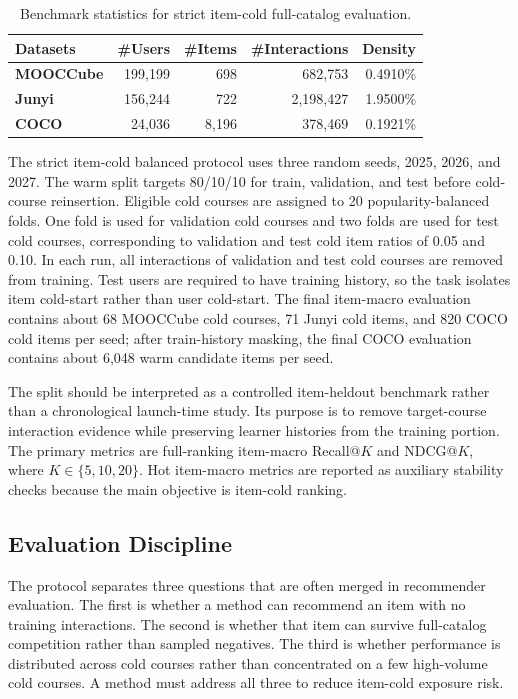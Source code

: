 \documentclass[sigconf,anonymous,review]{acmart}
\begin{document}
\begin{table}[t]
\centering
\caption{Benchmark statistics for strict item-cold full-catalog evaluation.}
\label{tab:dataset-statistics}
\small
\setlength{\tabcolsep}{14pt}
\renewcommand{\arraystretch}{1.05}
\begin{tabular}{lrrrr}
\toprule
\textbf{Datasets} & \textbf{\#Users} & \textbf{\#Items} & \textbf{\#Interactions} & \textbf{Density} \\
\midrule
\textbf{MOOCCube} & 199,199 & 698 & 682,753 & 0.4910\% \\
\textbf{Junyi} & 156,244 & 722 & 2,198,427 & 1.9500\% \\
\textbf{COCO} & 24,036 & 8,196 & 378,469 & 0.1921\% \\
\bottomrule
\end{tabular}
\end{table}

The strict item-cold balanced protocol uses three random seeds, 2025, 2026, and 2027. The warm split targets 80/10/10 for train, validation, and test before cold-course reinsertion. Eligible cold courses are assigned to 20 popularity-balanced folds. One fold is used for validation cold courses and two folds are used for test cold courses, corresponding to validation and test cold item ratios of 0.05 and 0.10. In each run, all interactions of validation and test cold courses are removed from training. Test users are required to have training history, so the task isolates item cold-start rather than user cold-start. The final item-macro evaluation contains about 68 MOOCCube cold courses, 71 Junyi cold items, and 820 COCO cold items per seed; after train-history masking, the final COCO evaluation contains about 6,048 warm candidate items per seed.

The split should be interpreted as a controlled item-heldout benchmark rather than a chronological launch-time study. Its purpose is to remove target-course interaction evidence while preserving learner histories from the training portion. The primary metrics are full-ranking item-macro Recall@\(K\) and NDCG@\(K\), where \(K \in \{5,10,20\}\). Hot item-macro metrics are reported as auxiliary stability checks because the main objective is item-cold ranking.

\subsection{Evaluation Discipline}
The protocol separates three questions that are often merged in recommender evaluation. The first is whether a method can recommend an item with no training interactions. The second is whether that item can survive full-catalog competition rather than sampled negatives. The third is whether performance is distributed across cold courses rather than concentrated on a few high-volume cold courses. A method must address all three to reduce item-cold exposure risk.
\end{document}
